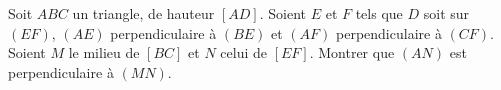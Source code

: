 Soit $ABC$ un triangle, de hauteur $[AD]$. Soient $E$ et $F$ tels que $D$ soit sur $(EF)$, $(AE)$ perpendiculaire à $(BE)$ et $(AF)$ perpendiculaire à $(CF)$. Soient $M$ le milieu de $[BC]$ et $N$ celui de $[EF]$. Montrer que $(AN)$ est perpendiculaire à $(MN)$.
